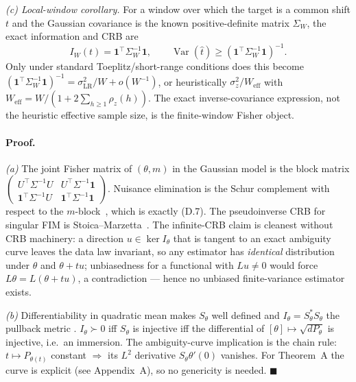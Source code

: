 \emph{(c) Local-window corollary.} For a window over which the target is a common shift $t$ and the Gaussian covariance is the known positive-definite matrix $\Sigma_W$, the exact information and CRB are
\[
I_W(t)=\mathbf1^\top\Sigma_W^{-1}\mathbf1,
\qquad
\operatorname{Var}(\hat t)\ge(\mathbf1^\top\Sigma_W^{-1}\mathbf1)^{-1}.
\]
Only under standard Toeplitz/short-range conditions does this become $(\mathbf1^\top\Sigma_W^{-1}\mathbf1)^{-1}=\sigma_{\mathrm{LR}}^2/W+o(W^{-1})$, or heuristically $\sigma_z^2/W_{\mathrm{eff}}$ with $W_{\mathrm{eff}}=W/(1+2\sum_{h\ge1}\rho_z(h))$. The exact inverse-covariance expression, not the heuristic effective sample size, is the finite-window Fisher object.

\paragraph{Proof.} \emph{(a)} The joint Fisher matrix of $(\theta,m)$ in the Gaussian model is the block matrix $\begin{pmatrix}U^{\top}\Sigma^{-1}U & U^{\top}\Sigma^{-1}\mathbf 1\\ \mathbf 1^{\top}\Sigma^{-1}U & \mathbf 1^{\top}\Sigma^{-1}\mathbf 1\end{pmatrix}$. Nuisance elimination is the Schur complement with respect to the $m$-block~\cite{LehmannCasella1998}, which is exactly (D.7). The pseudoinverse CRB for singular FIM is Stoica--Marzetta~\cite{StoicaMarzetta2001}. The infinite-CRB claim is cleanest without CRB machinery: a direction $u\in\ker I_\theta$ that is tangent to an exact ambiguity curve leaves the data law invariant, so any estimator has \emph{identical} distribution under $\theta$ and $\theta+tu$; unbiasedness for a functional with $Lu\neq0$ would force $L\theta=L(\theta+tu)$, a contradiction --- hence no unbiased finite-variance estimator exists.

\emph{(b)} Differentiability in quadratic mean makes $S_\theta$ well defined and $I_\theta=S_\theta^*S_\theta$ the pullback metric \cite[Ch.~7]{vanderVaart1998}. $I_\theta\succ0$ iff $S_\theta$ is injective iff the differential of $[\theta]\mapsto\sqrt{dP_\theta}$ is injective, i.e.\ an immersion. The ambiguity-curve implication is the chain rule: $t\mapsto P_{\theta(t)}$ constant $\Rightarrow$ its $L^2$ derivative $S_\theta\theta'(0)$ vanishes. For Theorem~A the curve is explicit (see Appendix~A), so no genericity is needed. \hfill$\blacksquare$

